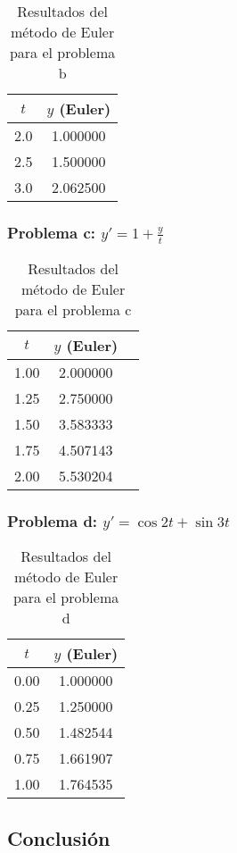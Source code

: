 \documentclass[12pt,a4paper]{article}
\begin{document}
\begin{table}[H]
\centering
\begin{tabular}{cc}
\toprule
$t$ & $y$ (Euler) \\
\midrule
2.0 & 1.000000 \\
2.5 & 1.500000 \\
3.0 & 2.062500 \\
\bottomrule
\end{tabular}
\caption{Resultados del método de Euler para el problema b}
\end{table}

\subsubsection{Problema c: $y' = 1 + \frac{y}{t}$}

\begin{table}[H]
\centering
\begin{tabular}{ccc}
\toprule
$t$ & $y$ (Euler) \\
\midrule
1.00 & 2.000000 \\
1.25 & 2.750000 \\
1.50 & 3.583333 \\
1.75 & 4.507143 \\
2.00 & 5.530204 \\
\bottomrule
\end{tabular}
\caption{Resultados del método de Euler para el problema c}
\end{table}

\subsubsection{Problema d: $y' = \cos 2t + \sin 3t$}

\begin{table}[H]
\centering
\begin{tabular}{cc}
\toprule
$t$ & $y$ (Euler) \\
\midrule
0.00 & 1.000000 \\
0.25 & 1.250000 \\
0.50 & 1.482544 \\
0.75 & 1.661907 \\
1.00 & 1.764535 \\
\bottomrule
\end{tabular}
\caption{Resultados del método de Euler para el problema d}
\end{table}

\subsection{Conclusión}
\end{document}
